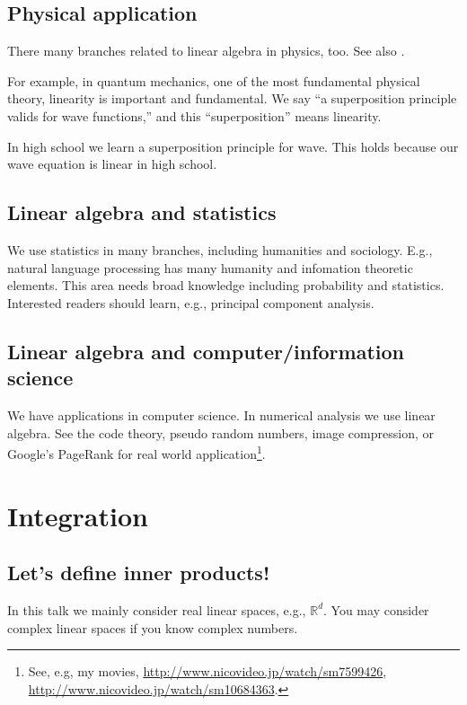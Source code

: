 \documentclass[openany, a4paper, oneside]{book}
\theoremstyle{break}
\theoremstyle{breakdefn}
\newcommand{\bbRd}{\mathbb{R}^d}
\begin{document}
\subsection{Physical application}
\label{sec-4-1-2-9}

There many branches related to linear algebra in physics, too.
See also \cite{phasetr2}.

For example, in quantum mechanics, one of the most fundamental physical theory,
linearity is important and fundamental.
We say ``a superposition principle valids for wave functions,''
and this ``superposition'' means linearity.

In high school we learn a superposition principle for wave.
This holds because our wave equation is linear in high school.
\subsection{Linear algebra and statistics}
\label{sec-4-1-2-10}

We use statistics in many branches, including humanities and sociology.
E.g., natural language processing has many humanity and infomation theoretic elements.
This area needs broad knowledge including probability and statistics.
Interested readers should learn, e.g., principal component analysis.
\subsection{Linear algebra and computer/information science}
\label{sec-4-1-2-11}

We have applications in computer science.
In numerical analysis we use linear algebra.
See the code theory, pseudo random numbers, image compression, or Google's
PageRank for real world application\footnote{See, e.g, my movies,
\href{http://www.nicovideo.jp/watch/sm7599426}{http://www.nicovideo.jp/watch/sm7599426}, \href{http://www.nicovideo.jp/watch/sm10684363}{http://www.nicovideo.jp/watch/sm10684363}.
 }.
\section{Integration}
\label{sec-4-1-3}
\subsection{Let's define inner products!}
\label{sec-4-1-3-1}

In this talk we mainly consider real linear spaces, e.g., $\bbRd$.
You may consider complex linear spaces if you know complex numbers.
\end{document}
